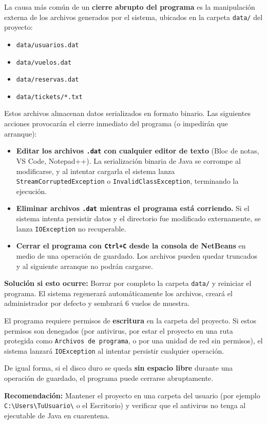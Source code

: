 \documentclass[12pt, letterpaper]{article}
\begin{document}
\begin{tcolorbox}[colback=lightgray, colframe=warningred, title=\textbf{1. ERROR FATAL: Manipulación Manual de los Archivos de Datos}]
	La causa más común de un \textbf{cierre abrupto del programa} es la manipulación externa de los archivos generados por el sistema, ubicados en la carpeta \texttt{data/} del proyecto:
	\begin{itemize}
		\item \texttt{data/usuarios.dat}
		\item \texttt{data/vuelos.dat}
		\item \texttt{data/reservas.dat}
		\item \texttt{data/tickets/*.txt}
	\end{itemize}
	Estos archivos almacenan datos serializados en formato binario. Las siguientes acciones provocarán el cierre inmediato del programa (o impedirán que arranque):
	\begin{itemize}
		\item \textbf{Editar los archivos \texttt{.dat} con cualquier editor de texto} (Bloc de notas, VS Code, Notepad++). La serialización binaria de Java se corrompe al modificarse, y al intentar cargarla el sistema lanza \texttt{StreamCorruptedException} o \texttt{InvalidClassException}, terminando la ejecución.
		\item \textbf{Eliminar archivos \texttt{.dat} mientras el programa está corriendo.} Si el sistema intenta persistir datos y el directorio fue modificado externamente, se lanza \texttt{IOException} no recuperable.
		\item \textbf{Cerrar el programa con \texttt{Ctrl+C} desde la consola de NetBeans} en medio de una operación de guardado. Los archivos pueden quedar truncados y al siguiente arranque no podrán cargarse.
	\end{itemize}
	\textbf{Solución si esto ocurre:} Borrar por completo la carpeta \texttt{data/} y reiniciar el programa. El sistema regenerará automáticamente los archivos, creará el administrador por defecto y sembrará 6 vuelos de muestra.
\end{tcolorbox}

\begin{tcolorbox}[colback=lightgray, colframe=warningred, title=\textbf{2. ERROR FATAL: Falta de Permisos o Espacio en Disco}]
	El programa requiere permisos de \textbf{escritura} en la carpeta del proyecto. Si estos permisos son denegados (por antivirus, por estar el proyecto en una ruta protegida como \texttt{Archivos de programa}, o por una unidad de red sin permisos), el sistema lanzará \texttt{IOException} al intentar persistir cualquier operación.
	
	De igual forma, si el disco duro se queda \textbf{sin espacio libre} durante una operación de guardado, el programa puede cerrarse abruptamente.
	
	\textbf{Recomendación:} Mantener el proyecto en una carpeta del usuario (por ejemplo \texttt{C:\textbackslash Users\textbackslash TuUsuario\textbackslash} o el Escritorio) y verificar que el antivirus no tenga al ejecutable de Java en cuarentena.
\end{tcolorbox}
\end{document}
